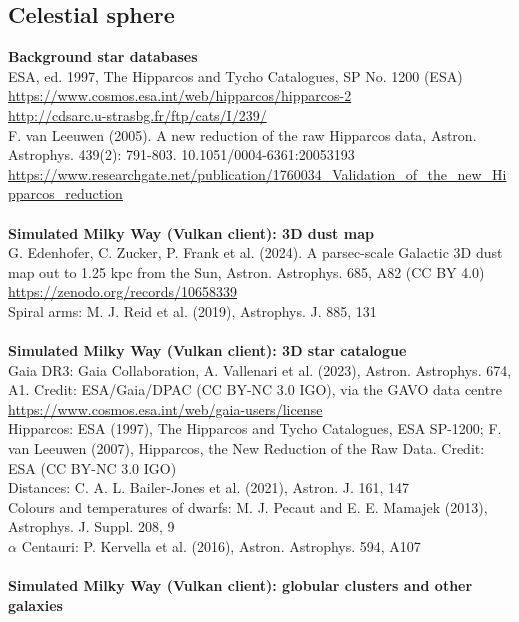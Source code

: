 \documentclass[Orbiter User Manual.tex]{subfiles}
\begin{document}
\subsection{Celestial sphere}
\textbf{Background star databases}\\
ESA, ed. 1997, The Hipparcos and Tycho Catalogues, SP No. 1200 (ESA)\\
\url{https://www.cosmos.esa.int/web/hipparcos/hipparcos-2}\\
\url{http://cdsarc.u-strasbg.fr/ftp/cats/I/239/}\\
F. van Leeuwen (2005). A new reduction of the raw Hipparcos data, Astron. Astrophys. 439(2): 791-803. 10.1051/0004-6361:20053193\\
\url{https://www.researchgate.net/publication/1760034_Validation_of_the_new_Hipparcos_reduction}\\
\\
\textbf{Simulated Milky Way (Vulkan client): 3D dust map}\\
G. Edenhofer, C. Zucker, P. Frank et al. (2024). A parsec-scale Galactic 3D dust map out to 1.25 kpc from the Sun, Astron. Astrophys. 685, A82 (CC BY 4.0)\\
\url{https://zenodo.org/records/10658339}\\
Spiral arms: M. J. Reid et al. (2019), Astrophys. J. 885, 131\\
\\
\textbf{Simulated Milky Way (Vulkan client): 3D star catalogue}\\
Gaia DR3: Gaia Collaboration, A. Vallenari et al. (2023), Astron. Astrophys. 674, A1. Credit: ESA/Gaia/DPAC (CC BY-NC 3.0 IGO), via the GAVO data centre\\
\url{https://www.cosmos.esa.int/web/gaia-users/license}\\
Hipparcos: ESA (1997), The Hipparcos and Tycho Catalogues, ESA SP-1200; F. van Leeuwen (2007), Hipparcos, the New Reduction of the Raw Data. Credit: ESA (CC BY-NC 3.0 IGO)\\
Distances: C. A. L. Bailer-Jones et al. (2021), Astron. J. 161, 147\\
Colours and temperatures of dwarfs: M. J. Pecaut and E. E. Mamajek (2013), Astrophys. J. Suppl. 208, 9\\
$\alpha$ Centauri: P. Kervella et al. (2016), Astron. Astrophys. 594, A107\\
\\
\textbf{Simulated Milky Way (Vulkan client): globular clusters and other galaxies}\\
\end{document}
